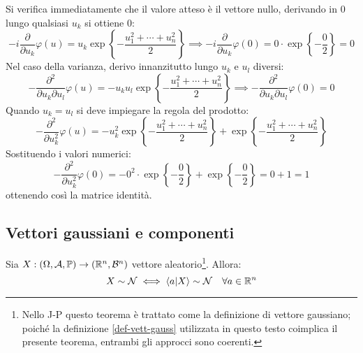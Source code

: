 \begin{ese}
  Si verifica immediatamente che il valore atteso è il vettore nullo, derivando in $0$ lungo qualsiasi $u_k$ si ottiene $0$:
  $$-i\frac{\partial}{\partial u_k} \varphi  (u) = u_k \exp \left\{-\frac{u_1^2 + \cdots + u_n^2}{2}\right\} \implies -i\frac{\partial}{\partial u_k} \varphi (0) = 0 \cdot \exp \left\{-\frac{0}{2}\right\} = 0$$
  Nel caso della varianza, derivo innanzitutto lungo $u_k$ e $u_l$ diversi:
  $$-\frac{\partial^2}{\partial u_k \partial u_l} \varphi(u) = -u_k u_l \exp \left\{-\frac{u_1^2 + \cdots + u_n^2}{2}\right\} \implies -\frac{\partial^2}{\partial u_k \partial u_l} \varphi(0) = 0$$
  Quando $u_k = u_l$ si deve impiegare la regola del prodotto:
  $$-\frac{\partial^2}{\partial u_k^2} \varphi(u) = -u_k^2 \exp \left\{-\frac{u_1^2 + \cdots + u_n^2}{2}\right\} + \exp \left\{-\frac{u_1^2 + \cdots + u_n^2}{2}\right\}$$
  Sostituendo i valori numerici:
  $$-\frac{\partial^2}{\partial u_k^2} \varphi(0) = -0^2 \cdot \exp \left\{-\frac{0}{2}\right\}+ \exp \left\{-\frac{0}{2}\right\} = 0+1 = 1$$
  ottenendo così la matrice identità.
\end{ese}

\subsection{Vettori gaussiani e componenti}

\begin{teo}\label{teo-vett-normali}
  Sia $X:\DoCo[n]$ vettore aleatorio\footnote{Nello J-P questo teorema è trattato come la definizione di vettore gaussiano; poiché la definizione \ref{def-vett-gauss} utilizzata in questo testo coimplica il presente teorema, entrambi gli approcci sono coerenti.}. Allora:
  $$X \sim \mathcal N \iff \langle a|X \rangle \sim \mathcal N \quad \forall a \in \mathbb R^n$$
\end{teo}

